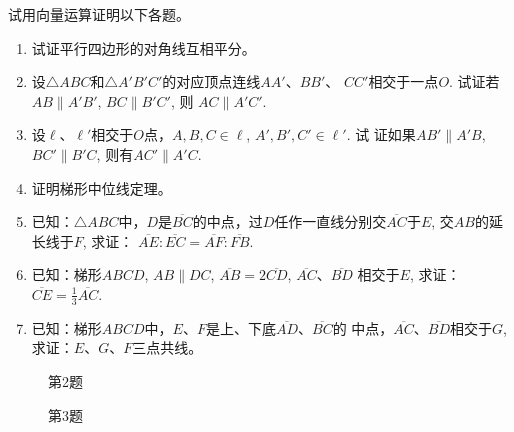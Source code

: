 \begin{ex}
    试用向量运算证明以下各题。
\begin{enumerate}
\item  试证平行四边形的对角线互相平分。
\item 设$\triangle ABC$和$\triangle A'B'C'$的对应顶点连线$AA'$、$BB'$、
    $CC'$相交于一点$O$. 试证若 $AB\parallel A'B'$, $BC\parallel B'C'$, 则
    $AC\parallel A'C'$.

\item 设$\ell$、$\ell'$相交于$O$点，$A,B,C\in\ell$, $A',B',C'\in\ell'$. 试
证如果$AB'\parallel A'B$, $BC'\parallel B'C$, 则有$AC'\parallel A'C$.
\item 证明梯形中位线定理。
\item 已知：$\triangle ABC$中，$D$是$\overline{BC}$的中点，过$D$任作一直线分别交$\overline{AC}$于$E$, 交$AB$的延长线于$F$, 求证：
$\overline{AE}:\overline{EC}=\overline{AF}:\overline{FB}$.
\item 已知：梯形$ABCD$, $AB\parallel DC$, $\overline{AB}=2\overline{CD}$, $\overline{AC}$、$\overline{BD}$
相交于$E$, 求证：$\overline{CE}=\frac{1}{3}\overline{AC}$.
\item 已知：梯形$ABCD$中，$E$、$F$是上、下底$\overline{AD}$、$\overline{BC}$的
中点，$\overline{AC}$、$\overline{BD}$相交于$G$, 求证：$E$、$G$、$F$三点共线。
\end{enumerate}
\end{ex}

\begin{figure}[htp]\centering
    \begin{minipage}[t]{0.48\textwidth}
    \centering
{}
    \caption*{第2题}
    \end{minipage}
    \begin{minipage}[t]{0.48\textwidth}
    \centering
    \caption*{第3题}
    \end{minipage}
    \end{figure}

